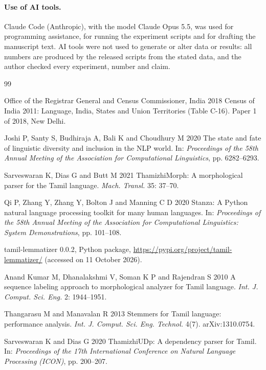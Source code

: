 \documentclass{sadhana}
\begin{document}
\paragraph{Use of AI tools.} Claude Code (Anthropic), with the model Claude
Opus 5.5, was used for programming assistance, for running the experiment
scripts and for drafting the manuscript text. AI tools were not used to generate or alter data or results: all
numbers are produced by the released scripts from the stated data, and the
author checked every experiment, number and claim.

\begin{thebibliography}{99}

Office of the Registrar General and Census Commissioner, India 2018 Census of
India 2011: Language, India, States and Union Territories (Table C-16).
Paper 1 of 2018, New Delhi. %

Joshi P, Santy S, Budhiraja A, Bali K and Choudhury M 2020 The state and fate
of linguistic diversity and inclusion in the NLP world. In: \emph{Proceedings
of the 58th Annual Meeting of the Association for Computational Linguistics},
pp. 6282--6293.

Sarveswaran K, Dias G and Butt M 2021 ThamizhiMorph: A morphological parser
for the Tamil language. \emph{Mach. Transl.} 35: 37--70.

Qi P, Zhang Y, Zhang Y, Bolton J and Manning C D 2020 Stanza: A Python natural
language processing toolkit for many human languages. In: \emph{Proceedings of
the 58th Annual Meeting of the Association for Computational Linguistics:
System Demonstrations}, pp. 101--108.

tamil-lemmatizer 0.0.2, Python package,
\url{https://pypi.org/project/tamil-lemmatizer/} (accessed on 11 October 2026).

Anand Kumar M, Dhanalakshmi V, Soman K P and Rajendran S 2010 A sequence
labeling approach to morphological analyzer for Tamil language. \emph{Int.
J. Comput. Sci. Eng.} 2: 1944--1951. %

Thangarasu M and Manavalan R 2013 Stemmers for Tamil language: performance
analysis. \emph{Int. J. Comput. Sci. Eng. Technol.} 4(7). arXiv:1310.0754.

Sarveswaran K and Dias G 2020 ThamizhiUDp: A dependency parser for Tamil. In:
\emph{Proceedings of the 17th International Conference on Natural Language
Processing (ICON)}, pp. 200--207.


\end{thebibliography}
\end{document}
